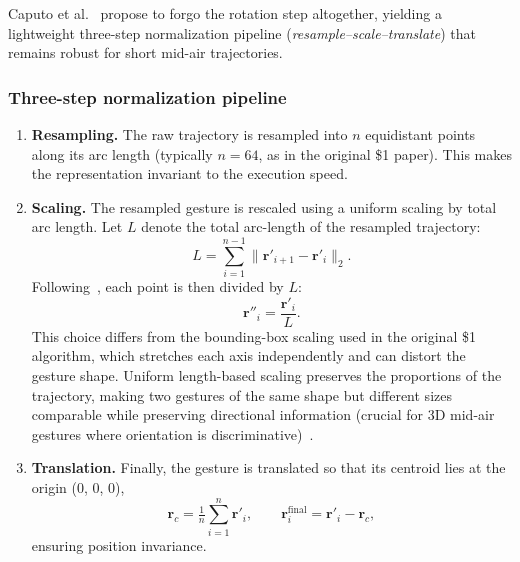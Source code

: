 Caputo et al.~\cite{Caputo2018} propose to forgo the rotation step altogether,
yielding a lightweight three-step normalization pipeline
(\emph{resample--scale--translate}) that remains robust for short mid-air
trajectories.

\subsubsection*{Three-step normalization pipeline}
 
\begin{enumerate}\itemsep 0em
    \item \textbf{Resampling.} The raw trajectory is resampled into $n$
    equidistant points along its arc length (typically $n = 64$, as in the
    original \$1 paper). This makes the representation invariant to the
    execution speed.
 
    \item \textbf{Scaling.} The resampled gesture is rescaled using a
    uniform scaling by total arc length. Let $L$ denote the total
    arc-length of the resampled trajectory:
    \begin{equation}
        L = \sum_{i=1}^{n-1} \lVert \mathbf{r}'_{i+1} - \mathbf{r}'_{i} \rVert_2 .
    \end{equation}
    Following~\cite{Caputo2018}, each point is then divided by $L$:
    \begin{equation}
        \mathbf{r}''_i = \frac{\mathbf{r}'_i}{L} .
    \end{equation}
    This choice differs from the bounding-box scaling used in the original
    \$1 algorithm, which stretches each axis independently and can distort
    the gesture shape. Uniform length-based scaling preserves the
    proportions of the trajectory, making two gestures of the same shape but
    different sizes comparable while preserving directional information
    (crucial for 3D mid-air gestures where orientation is
    discriminative)~\cite{Caputo2018}.
 
    \item \textbf{Translation.} Finally, the gesture is translated so that its
    centroid lies at the origin (0, 0, 0),
    \begin{equation}
        \mathbf{r}_{c} = \tfrac{1}{n} \sum_{i=1}^{n} \mathbf{r}'_i ,
        \qquad
        \mathbf{r}^{\text{final}}_{i} = \mathbf{r}'_i - \mathbf{r}_{c} ,
    \end{equation}
    ensuring position invariance.
\end{enumerate}

